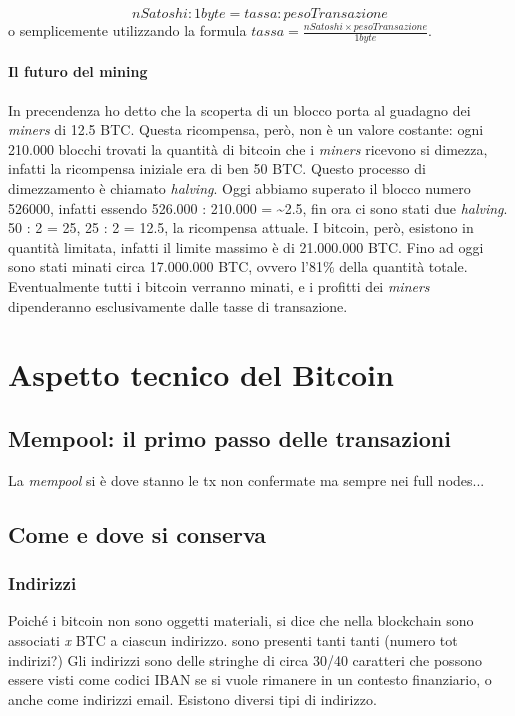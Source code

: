 \documentclass {article}
\begin{document}
$$ nSatoshi : 1 byte = tassa : pesoTransazione $$
%
o semplicemente utilizzando la formula $tassa = \frac{nSatoshi \times pesoTransazione}{1 byte}$.

\paragraph {Il futuro del mining}

In precendenza ho detto che la scoperta di un blocco porta al guadagno dei \textit{miners} di 12.5 BTC.
Questa ricompensa, però, non è un valore costante: ogni 210.000 blocchi trovati la quantità di bitcoin che i \textit{miners} ricevono si dimezza, infatti la ricompensa iniziale era di ben 50 BTC. Questo processo di dimezzamento è chiamato \textit{halving}.
Oggi abbiamo superato il blocco numero 526000, infatti essendo 526.000 : 210.000 = \textasciitilde 2.5, fin ora ci sono stati due \textit{halving}.
50 : 2 = 25, 25 : 2 = 12.5, la ricompensa attuale.
I bitcoin, però, esistono in quantità limitata, infatti il limite massimo è di 21.000.000 BTC.
Fino ad oggi sono stati minati circa 17.000.000 BTC, ovvero l'81\% della quantità totale.
Eventualmente tutti i bitcoin verranno minati, e i profitti dei \textit{miners} dipenderanno esclusivamente dalle tasse di transazione.


\newpage


\section {Aspetto tecnico del Bitcoin}


\subsection {Mempool: il primo passo delle transazioni}


La \textit{mempool} si è dove stanno le tx non confermate ma sempre nei full nodes...


\subsection {Come e dove si conserva}


\subsubsection {Indirizzi}


Poiché i bitcoin non sono oggetti materiali, si dice che nella blockchain sono associati \textit{x} BTC a ciascun indirizzo.
sono presenti tanti tanti (numero tot indirizi?)
Gli indirizzi sono delle stringhe di circa 30/40 caratteri che possono essere visti come codici IBAN se si vuole rimanere in un contesto finanziario, o anche come indirizzi email.
Esistono diversi tipi di indirizzo.
\end{document}
